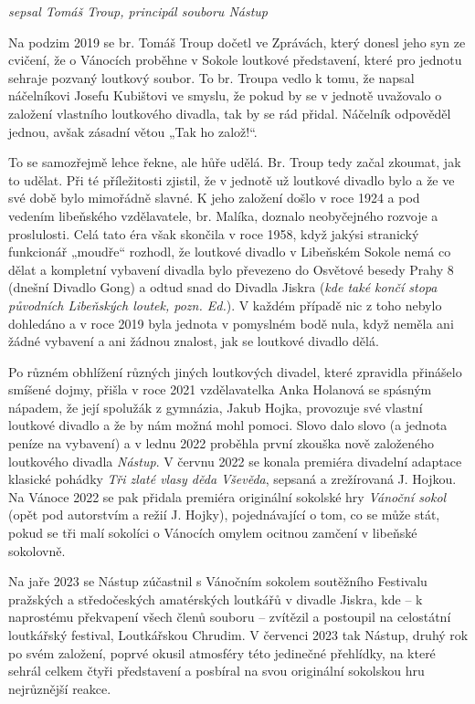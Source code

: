 \emph{sepsal Tomáš Troup, principál souboru Nástup}

Na podzim 2019 se br. Tomáš Troup dočetl ve Zprávách, který donesl jeho
syn ze cvičení, že o Vánocích proběhne v Sokole loutkové představení,
které pro jednotu sehraje pozvaný loutkový soubor. To br. Troupa vedlo k
tomu, že napsal náčelníkovi Josefu Kubištovi ve smyslu, že pokud by se v
jednotě uvažovalo o založení vlastního loutkového divadla, tak by se rád
přidal. Náčelník odpověděl jednou, avšak zásadní větou „Tak ho
založ!{}``.

To se samozřejmě lehce řekne, ale hůře udělá. Br. Troup tedy začal
zkoumat, jak to udělat. Při té příležitosti zjistil, že v jednotě už
loutkové divadlo bylo a že ve své době bylo mimořádně slavné. K jeho
založení došlo v roce 1924 a pod vedením libeňského vzdělavatele, br.
Malíka, doznalo neobyčejného rozvoje a proslulosti. Celá tato éra však
skončila v roce 1958, když jakýsi stranický funkcionář „moudře``
rozhodl, že loutkové divadlo v Libeňském Sokole nemá co dělat a
kompletní vybavení divadla bylo převezeno do Osvětové besedy Prahy 8
(dnešní Divadlo Gong) a odtud snad do Divadla Jiskra (\emph{kde také
končí stopa původních Libeňských loutek, pozn. Ed.}). V každém případě
nic z toho nebylo dohledáno a v roce 2019 byla jednota v pomyslném bodě
nula, když neměla ani žádné vybavení a ani žádnou znalost, jak se
loutkové divadlo dělá.

Po různém obhlížení různých jiných loutkových divadel, které zpravidla
přinášelo smíšené dojmy, přišla v roce 2021 vzdělavatelka Anka Holanová
se spásným nápadem, že její spolužák z gymnázia, Jakub Hojka, provozuje
své vlastní loutkové divadlo a že by nám možná mohl pomoci. Slovo dalo
slovo (a jednota peníze na vybavení) a v lednu 2022 proběhla první
zkouška nově založeného loutkového divadla \emph{Nástup}. V červnu 2022
se konala premiéra divadelní adaptace klasické pohádky \emph{Tři zlaté
vlasy děda Vševěda}, sepsaná a zrežírovaná J. Hojkou. Na Vánoce 2022 se
pak přidala premiéra originální sokolské hry \emph{Vánoční sokol} (opět
pod autorstvím a režií J. Hojky), pojednávající o tom, co se může stát,
pokud se tři malí sokolíci o Vánocích omylem ocitnou zamčení v libeňské
sokolovně.

Na jaře 2023 se Nástup zúčastnil s Vánočním sokolem soutěžního Festivalu
pražských a středočeských amatérských loutkářů v divadle Jiskra, kde --
k naprostému překvapení všech členů souboru -- zvítězil a postoupil na
celostátní loutkářský festival, Loutkářskou Chrudim. V červenci 2023 tak
Nástup, druhý rok po svém založení, poprvé okusil atmosféry této
jedinečné přehlídky, na které sehrál celkem čtyři představení a posbíral
na svou originální sokolskou hru nejrůznější reakce.

